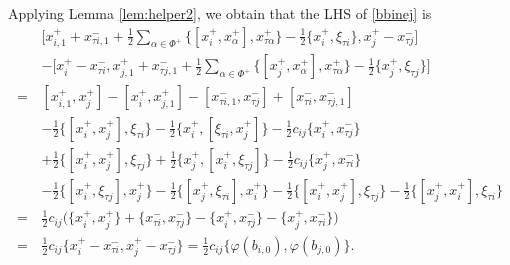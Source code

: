 \documentclass[11pt,reqno]{amsart}
\numberwithin{equation}{section}
\theoremstyle{definition}
\theoremstyle{remark}
\newcommand{\hf}{\tfrac12}
\begin{document}
Applying Lemma \ref{lem:helper2}, we obtain that the LHS of \eqref{bbinej} is
\begin{align*}
&\Big[x_{i,1}^++x_{\tau i,1}^-+\hf\sum_{\alpha\in\Phi^+}\big\{[x_i^+,x_\alpha^+],x_{\tau \alpha}^+\big\}-\hf\big\{x_i^+,\xi_{\tau i}\big\},x_j^+-x_{\tau j}^-\Big]\\
&-\Big[x_i^+-x_{\tau i}^-,x_{j,1}^++x_{\tau j,1}^-+\hf\sum_{\alpha\in\Phi^+}\big\{[x_j^+,x_\alpha^+],x_{\tau \alpha}^+\big\}-\hf\big\{x_j^+,\xi_{\tau j}\big\}\Big]
\\
=\,&[x_{i,1}^+,x_j^+]-[x_i^+,x_{j,1}^+]-[x_{\tau i,1}^-,x_{\tau j}^-]+[x_{\tau i}^-,x_{\tau j,1}^-]
\\
&-\hf\big\{[x_i^+,x_j^+],\xi_{\tau i}\big\}-\hf\big\{x_i^+,[\xi_{\tau i},x_j^+]\big\}-\hf c_{ij}\big\{x_i^+,x_{\tau j}^-\big\}
\\
&+\hf\big\{[x_i^+,x_j^+],\xi_{\tau j}\big\}+\hf\big\{x_j^+,[x_i^+,\xi_{\tau j}]\big\}-\hf c_{ij}\big\{x_j^+,x_{\tau i}^-\big\}
\\
&-\hf\big\{[x_i^+,\xi_{\tau j}],x_j^+\big\}-\hf\big\{[x_j^+,\xi_{\tau i}],x_i^+\big\}-\hf\big\{[x_i^+,x_j^+],\xi_{\tau j}\big\}-\hf\big\{[x_j^+,x_i^+],\xi_{\tau i}\big\}\\
=\,&\hf c_{ij}\big(\{x_i^+,x_j^+\}+\{x_{\tau i}^-,x_{\tau j}^-\}-\{x_i^+,x_{\tau j}^-\}-\{x_j^+,x_{\tau i}^-\}\big)\\
=\,&\hf c_{ij}\{x_i^+-x_{\tau i}^-,x_j^+-x_{\tau j}^-\}=\hf c_{ij}\{\varphi(b_{i,0}),\varphi(b_{j,0})\}.
\end{align*}
\end{document}

